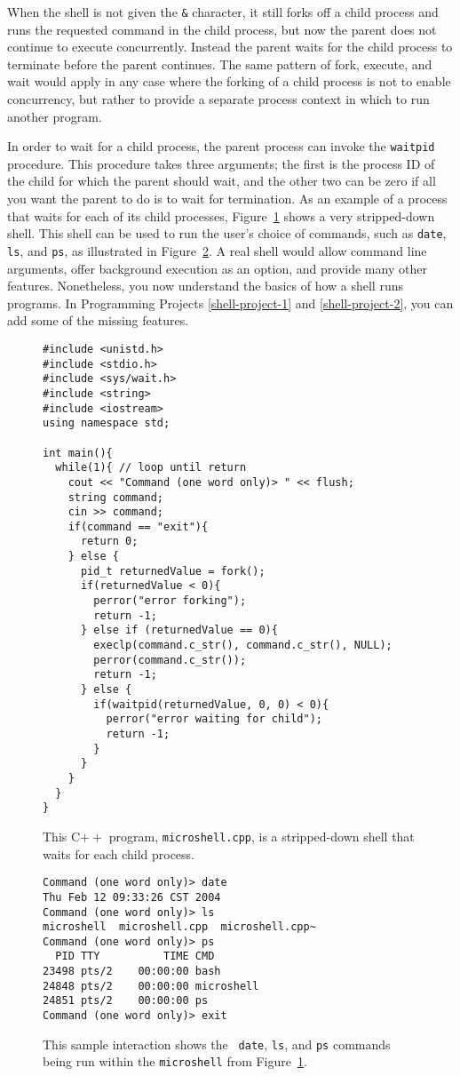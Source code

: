 When the shell is not given the \verb|&| character, it still forks off
a child process and runs the requested command in the child process,
but now the parent does not continue to execute concurrently.  Instead
the parent waits for the child process to terminate before the parent
continues.  The same pattern of fork, execute, and wait would apply in
any case where the forking of a child process is not to enable
concurrency, but rather to provide a separate process context
in which to run another program.

In order to wait for a child process, the parent process can invoke
the
\verb|waitpid| procedure.
This procedure takes three arguments; the first is the
process ID of the child for which the parent should wait, and the other two can be zero if
all you want the parent to do is to wait for termination.   As an example of a
process that waits for each of its child processes,
Figure~\ref{microshell-code} shows a very stripped-down shell.  This
shell can be used to run the user's choice of commands, such as
\verb|date|, \verb|ls|, and \verb|ps|, as illustrated in
Figure~\ref{microshell-output}.  A real shell would allow command line
arguments, offer background execution as an option, and provide many
other features.  Nonetheless, you now understand the basics of how
a shell runs programs.  In Programming Projects \ref{shell-project-1}
and \ref{shell-project-2}, you can add some of the missing features.
\begin{figure}
\begin{verbatim}
#include <unistd.h>
#include <stdio.h>
#include <sys/wait.h>
#include <string>
#include <iostream>
using namespace std;

int main(){
  while(1){ // loop until return
    cout << "Command (one word only)> " << flush;
    string command;
    cin >> command;
    if(command == "exit"){
      return 0;
    } else {
      pid_t returnedValue = fork();
      if(returnedValue < 0){
        perror("error forking");
        return -1;
      } else if (returnedValue == 0){
        execlp(command.c_str(), command.c_str(), NULL);
        perror(command.c_str());
        return -1;
      } else {
        if(waitpid(returnedValue, 0, 0) < 0){
          perror("error waiting for child");
          return -1;
        }
      }
    }
  }
}
\end{verbatim}
\caption{This C$++$ program, {\tt microshell.cpp}, is a stripped-down
  shell that waits for each child process.}
\label{microshell-code}
\end{figure}
\begin{figure}
\begin{verbatim}
Command (one word only)> date
Thu Feb 12 09:33:26 CST 2004
Command (one word only)> ls
microshell  microshell.cpp  microshell.cpp~
Command (one word only)> ps
  PID TTY          TIME CMD
23498 pts/2    00:00:00 bash
24848 pts/2    00:00:00 microshell
24851 pts/2    00:00:00 ps
Command (one word only)> exit
\end{verbatim}
\caption{This sample interaction shows the {\tt
  date}, {\tt ls}, and {\tt ps} commands being run within the
  {\tt microshell} from Figure~\ref{microshell-code}.}
\label{microshell-output}
\end{figure}

